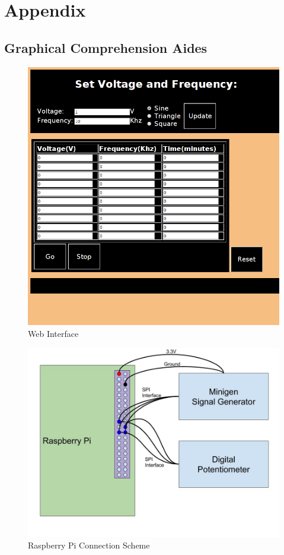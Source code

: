 \documentclass{article}	%
\begin{document}
\section{Appendix}
\subsection{Graphical Comprehension Aides}
\begin{figure}[!hbt]
\begin{center}
\includegraphics[width=1.0\textwidth,keepaspectratio]{491_web_interface_good.png}
\end{center}
\caption{Web Interface}
\end{figure}

\begin{figure}[!hbt]
\begin{center}
\includegraphics[width=1.0\textwidth,keepaspectratio]{"Diagram - Pi to Minigen and MCP4131"}
\end{center}
\caption{Raspberry Pi Connection Scheme}
\end{figure}
\end{document}
